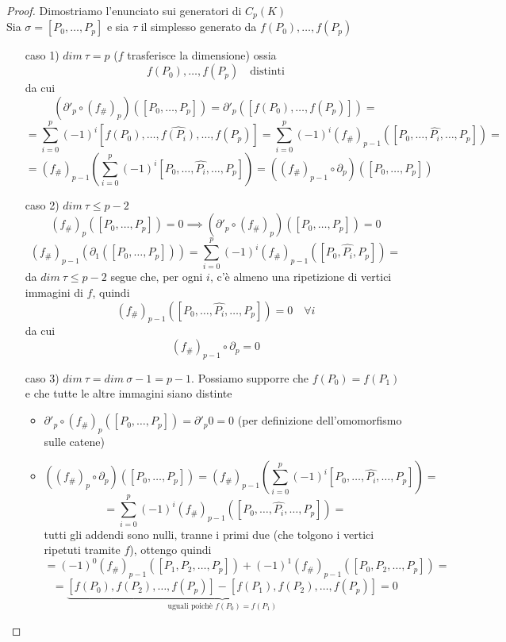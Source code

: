 \documentclass[a4paper]{report}
\newcommand{\shrp}[1]{\ensuremath{({#1}_\#)_p}}
\begin{document}
\begin{proof}
    Dimostriamo l'enunciato sui generatori di $C_p(K)$\\
    Sia $\sigma=[P_0,\dots,P_p]$ e sia $\tau$ il simplesso generato da $f(P_0),\dots,f(P_p)$\\
    \begin{enumerate}
        \item[caso 1)] $dim\ \tau=p$ ($f$ trasferisce la dimensione) ossia
        \[
            f(P_0),\dots,f(P_p)\quad\text{distinti}    
        \]
        da cui
        \[
            \left(\partial'_p\circ\shrp{f}\right)([P_0,\dots,P_p])=\partial'_p([f(P_0),\dots,f(P_p)])=
        \]
        \[
            =\sum_{i=0}^p(-1)^i[f(P_0),\dots,\hat{f(P_i)},\dots,f(P_p)]=\sum_{i=0}^p(-1)^i(f_\#)_{p-1}([P_0,\dots,\hat{P_i},\dots,P_p])=
        \]
        \[
            =(f_\#)_{p-1}\left(\sum_{i=0}^p(-1)^i[P_0,\dots,\hat{P_i},\dots,P_p]\right)=\left((f_\#)_{p-1}\circ\partial_p\right)([P_0,\dots,P_p])    
        \]
        \item[caso 2)] $dim\ \tau\leq p-2$
        \[
            \shrp{f}([P_0,\dots,P_p])=0\implies\left(\partial'_p\circ\shrp{f}\right)([P_0,\dots,P_p])=0
        \]
        \[
            (f_\#)_{p-1}(\partial_1([P_0,\dots,P_p]))=\sum_{i=0}^p(-1)^i(f_\#)_{p-1}([P_0,\hat{P_i},P_p])=
        \]
        da $dim\ \tau\leq p-2$ segue che, per ogni $i$, c'è almeno una ripetizione di vertici immagini di $f$, quindi
        \[
            (f_\#)_{p-1}([P_0,\dots,\hat{P_i},\dots,P_p])=0\quad\forall i
        \]
        da cui
        \[
            (f_\#)_{p-1}\circ\partial_p=0    
        \]
        \item[caso 3)] $dim\ \tau=dim\ \sigma-1=p-1$. Possiamo supporre che $f(P_0)=f(P_1)$ e che tutte le altre immagini siano distinte
        \begin{itemize}
            \item $\partial'_p\circ\shrp{f}([P_0,\dots,P_p])=\partial'_p 0=0$ (per definizione dell'omomorfismo sulle catene)
            \item \[
                \left(\shrp{f}\circ\partial_p\right)([P_0,\dots,P_p])=(f_\#)_{p-1}\left(\sum_{i=0}^p(-1)^i[P_0,\dots,\hat{P_i},\dots,P_p]\right)=
            \]
            \[
                =\sum_{i=0}^p(-1)^i(f_\#)_{p-1}([P_0,\dots,\hat{P_i},\dots,P_p])=    
            \]
            tutti gli addendi sono nulli, tranne i primi due (che tolgono i vertici ripetuti tramite $f$), ottengo quindi
            \[
                =(-1)^0(f_\#)_{p-1}([P_1,P_2,\dots,P_p])+(-1)^1(f_\#)_{p-1}([P_0,P_2,\dots,P_p])=
            \]
            \[
                =\underbrace{[f(P_0),f(P_2),\dots,f(P_p)]-[f(P_1),f(P_2),\dots,f(P_p)]}_{\text{uguali poichè }f(P_0)=f(P_1)}=0    
            \]
        \end{itemize}
    \end{enumerate}
\end{proof}
\end{document}
